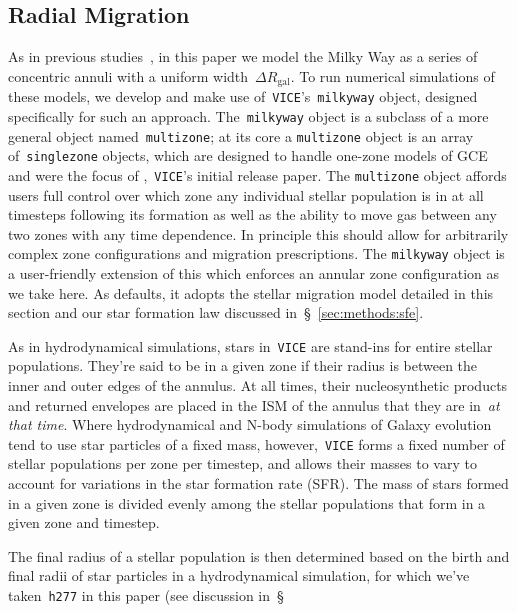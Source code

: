 \documentclass[fleqn, usenatbib]{mnras}
\begin{document}
\subsection{Radial Migration} 
\label{sec:methods:migration} 
As in previous studies~\citep[e.g.][]{Schoenrich2009, Minchev2013, Sharma2020}, 
in this paper we model the Milky Way as a series of concentric annuli with a 
uniform width~$\Delta R_\text{gal}$. To run numerical simulations of these 
models, we develop and make use of~\texttt{VICE}'s~\texttt{milkyway} object, 
designed specifically for such an approach. The~\texttt{milkyway} object is a 
subclass of a more general object named~\texttt{multizone}; at its core a 
\texttt{multizone} object is an array of~\texttt{singlezone} objects, which are 
designed to handle one-zone models of GCE and were the focus of 
\citet{Johnson2020},~\texttt{VICE}'s initial release paper. The 
\texttt{multizone} object affords users full control over which zone any 
individual stellar population is in at all timesteps following its formation as 
well as the ability to move gas between any two zones with any time dependence. 
In principle this should allow for arbitrarily complex zone configurations and 
migration prescriptions. The \texttt{milkyway} object is a user-friendly 
extension of this which enforces an annular zone configuration as we take here. 
As defaults, it adopts the stellar migration model detailed in this section and 
our star formation law discussed in~\S~\ref{sec:methods:sfe}. 
\par 
As in hydrodynamical simulations, stars in~\texttt{VICE} are stand-ins for 
entire stellar populations. They're said to be in a given zone if their radius 
is between the inner and outer edges of the annulus. At all times, their 
nucleosynthetic products and returned envelopes are placed in the ISM of the 
annulus that they are in~\textit{at that time}. Where hydrodynamical and 
N-body simulations of Galaxy evolution tend to use star particles of a fixed 
mass, however,~\texttt{VICE} forms a fixed number of stellar populations per 
zone per timestep, and allows their masses to vary to account for variations 
in the star formation rate (SFR). The mass of stars formed in a given zone is 
divided evenly among the stellar populations that form in a given zone and 
timestep. 
\par 
The final radius of a stellar population is then determined based on the birth 
and final radii of star particles in a hydrodynamical simulation, for which 
we've taken~\texttt{h277} in this paper (see discussion in~\S 
\end{document}
